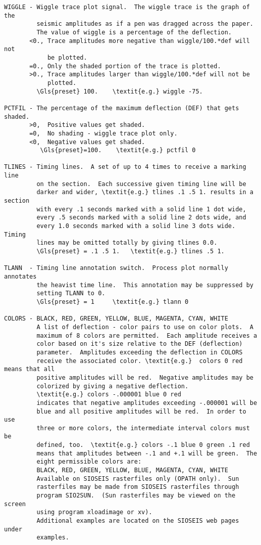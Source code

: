 \begin{verbatim}
WIGGLE - Wiggle trace plot signal.  The wiggle trace is the graph of the
         seismic amplitudes as if a pen was dragged across the paper.
         The value of wiggle is a percentage of the deflection.
       <0., Trace amplitudes more negative than wiggle/100.*def will not
            be plotted.
       =0., Only the shaded portion of the trace is plotted.
       >0., Trace amplitudes larger than wiggle/100.*def will not be
            plotted.
         \Gls{preset} 100.    \textit{e.g.} wiggle -75.

PCTFIL - The percentage of the maximum deflection (DEF) that gets shaded.
       >0,  Positive values get shaded.
       =0,  No shading - wiggle trace plot only.
       <0,  Negative values get shaded.
          \Gls{preset}=100.    \textit{e.g.} pctfil 0

TLINES - Timing lines.  A set of up to 4 times to receive a marking line
         on the section.  Each successive given timing line will be
         darker and wider, \textit{e.g.} tlines .1 .5 1. results in a section
         with every .1 seconds marked with a solid line 1 dot wide,
         every .5 seconds marked with a solid line 2 dots wide, and
         every 1.0 seconds marked with a solid line 3 dots wide.  Timing
         lines may be omitted totally by giving tlines 0.0.
         \Gls{preset} = .1 .5 1.   \textit{e.g.} tlines .5 1.

TLANN  - Timing line annotation switch.  Process plot normally annotates
         the heavist time line.  This annotation may be suppressed by
         setting TLANN to 0.
         \Gls{preset} = 1     \textit{e.g.} tlann 0

COLORS - BLACK, RED, GREEN, YELLOW, BLUE, MAGENTA, CYAN, WHITE
         A list of deflection - color pairs to use on color plots.  A
         maximum of 8 colors are permitted.  Each amplitude receives a
         color based on it's size relative to the DEF (deflection)
         parameter.  Amplitudes exceeding the deflection in COLORS
         receive the associated color. \textit{e.g.}  colors 0 red means that all
         positive amplitudes will be red.  Negative amplitudes may be
         colorized by giving a negative deflection.
         \textit{e.g.} colors -.000001 blue 0 red
         indicates that negative amplitudes exceeding -.000001 will be
         blue and all positive amplitudes will be red.  In order to use
         three or more colors, the intermediate interval colors must be
         defined, too.  \textit{e.g.} colors -.1 blue 0 green .1 red
         means that amplitudes between -.1 and +.1 will be green.  The
         eight permissible colors are:
         BLACK, RED, GREEN, YELLOW, BLUE, MAGENTA, CYAN, WHITE
         Available on SIOSEIS rasterfiles only (OPATH only).  Sun
         rasterfiles may be made from SIOSEIS rasterfiles through
         program SIO2SUN.  (Sun rasterfiles may be viewed on the screen
         using program xloadimage or xv).
         Additional examples are located on the SIOSEIS web pages under
         examples.


\end{verbatim}
